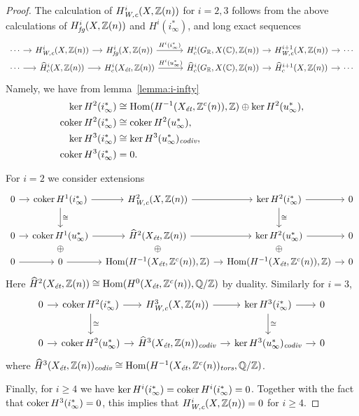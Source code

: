 \documentclass{article}
\numberwithin{equation}{section}
\begin{document}
\begin{proposition}
\begin{proof}
    The calculation of $H^i_\Wc (X, \ZZ(n))$ for $i = 2,3$ follows from the
    above calculations of $H^i_\fg (X, \ZZ(n))$ and $H^i (i^*_\infty)$, and long
    exact sequences
    \[ \begin{tikzcd}[column sep=1em,row sep=0pt]
        \cdots \ar{r} & H^i_\Wc (X, \ZZ(n)) \ar{r} & H^i_\fg (X, \ZZ(n)) \ar{r}{H^i (i^*_\infty)} &[2em] H^i_c (G_\RR, X(\CC), \ZZ(n)) \ar{r} & H^{i+1}_\Wc (X, \ZZ(n)) \ar{r} & \cdots \\
        \cdots \ar{r} & \widehat{H}^i_c (X, \ZZ(n)) \ar{r} & H^i_c (X_\et, \ZZ(n)) \ar{r}{H^i (u^*_\infty)} & \widehat{H}^i_c (G_\RR, X(\CC), \ZZ(n)) \ar{r} & \widehat{H}^{i+1}_c (X, \ZZ(n)) \ar{r} & \cdots
      \end{tikzcd} \]
    Namely, we have from lemma~\ref{lemma:i-infty}
    \begin{align*}
      \ker H^2 (i^*_\infty) & \cong \Hom (H^{-1} (X_\et, \ZZ^c(n)), \ZZ) \oplus \ker H^2 (u^*_\infty), \\
      \coker H^2 (i^*_\infty) & \cong \coker H^2 (u^*_\infty), \\
      \ker H^3 (i^*_\infty) & \cong \ker H^3 (u^*_\infty)_\codiv, \\
      \coker H^3 (i^*_\infty) & = 0.
    \end{align*}

    For $i = 2$ we consider extensions
    \[ \begin{tikzcd}[column sep=1em]
        0 \ar{r} & \coker H^1 (i^*_\infty) \ar{r}\ar{d}{\cong} & H^2_\Wc (X, \ZZ(n)) \ar{r} & \ker H^2 (i^*_\infty) \ar{r}\ar{d}{\cong} & 0 \\
        0 \ar{r} & \coker H^1 (u_\infty^*) \ar{r} & \widehat{H}^2 (X_\et, \ZZ(n)) \ar{r} & \ker H^2 (u_\infty^*) \ar{r} & 0 \\[-2em]
        & \oplus & \oplus & \oplus \\[-2em]
        0 \ar{r} & 0 \ar{r} & \Hom (H^{-1} (X_\et, \ZZ^c(n)), \ZZ) \ar{r} & \Hom (H^{-1} (X_\et, \ZZ^c(n)), \ZZ) \ar{r} & 0
      \end{tikzcd} \]
    Here
    $\widehat{H}^2 (X_\et, \ZZ(n)) \cong \Hom (H^0 (X_\et, \ZZ^c(n)), \QQ/\ZZ)$
    by duality. Similarly for $i = 3$,
    \[ \begin{tikzcd}[column sep=1em]
        0 \ar{r} & \coker H^2 (i^*_\infty) \ar{r}\ar{d}{\cong} & H^3_\Wc (X, \ZZ(n)) \ar{r} & \ker H^3 (i^*_\infty) \ar{r}\ar{d}{\cong} & 0 \\
        0 \ar{r} & \coker H^2 (u_\infty^*) \ar{r} & \widehat{H}^3 (X_\et, \ZZ(n))_\codiv \ar{r} & \ker H^3 (u_\infty^*)_\codiv \ar{r} & 0
      \end{tikzcd} \]
    where
    $\widehat{H}^3 (X_\et, \ZZ(n))_\codiv \cong \Hom (H^{-1} (X_\et, \ZZ^c(n))_\tors, \QQ/\ZZ)$.

    \vspace{1em}

    Finally, for $i \ge 4$ we have
    $\ker H^i (i^*_\infty) = \coker H^i (i^*_\infty) = 0$. Together with the
    fact that $\coker H^3 (i^*_\infty) = 0$, this implies that
    $H^i_\Wc (X, \ZZ(n)) = 0$ for $i \ge 4$.
  \end{proof}
\end{proposition}
\end{document}
